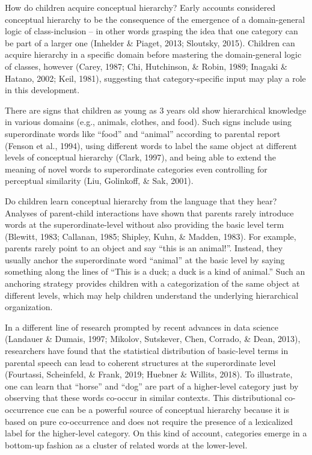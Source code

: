 \documentclass[10pt, letterpaper]{article}
\begin{document}
How do children acquire conceptual hierarchy? Early accounts considered
conceptual hierarchy to be the consequence of the emergence of a
domain-general logic of class-inclusion -- in other words grasping the
idea that one category can be part of a larger one (Inhelder \& Piaget,
2013; Sloutsky, 2015). Children can acquire hierarchy in a specific
domain before mastering the domain-general logic of classes, however
(Carey, 1987; Chi, Hutchinson, \& Robin, 1989; Inagaki \& Hatano, 2002;
Keil, 1981), suggesting that category-specific input may play a role in
this development.

There are signs that children as young as 3 years old show hierarchical
knowledge in various domains (e.g., animals, clothes, and food). Such
signs include using superordinate words like ``food'' and ``animal''
according to parental report (Fenson et al., 1994), using different
words to label the same object at different levels of conceptual
hierarchy (Clark, 1997), and being able to extend the meaning of novel
words to superordinate categories even controlling for perceptual
similarity (Liu, Golinkoff, \& Sak, 2001).

Do children learn conceptual hierarchy from the language that they hear?
Analyses of parent-child interactions have shown that parents rarely
introduce words at the superordinate-level without also providing the
basic level term (Blewitt, 1983; Callanan, 1985; Shipley, Kuhn, \&
Madden, 1983). For example, parents rarely point to an object and say
``this is an animal!''. Instead, they usually anchor the superordinate
word ``animal'' at the basic level by saying something along the lines
of ``This is a duck; a duck is a kind of animal.'' Such an anchoring
strategy provides children with a categorization of the same object at
different levels, which may help children understand the underlying
hierarchical organization.

In a different line of research prompted by recent advances in data
science (Landauer \& Dumais, 1997; Mikolov, Sutskever, Chen, Corrado, \&
Dean, 2013), researchers have found that the statistical distribution of
basic-level terms in parental speech can lead to coherent structures at
the superordinate level (Fourtassi, Scheinfeld, \& Frank, 2019; Huebner
\& Willits, 2018). To illustrate, one can learn that ``horse'' and
``dog'' are part of a higher-level category just by observing that these
words co-occur in similar contexts. This distributional co-occurrence
cue can be a powerful source of conceptual hierarchy because it is based
on pure co-occurrence and does not require the presence of a lexicalized
label for the higher-level category. On this kind of account, categories
emerge in a bottom-up fashion as a cluster of related words at the
lower-level.
\end{document}
